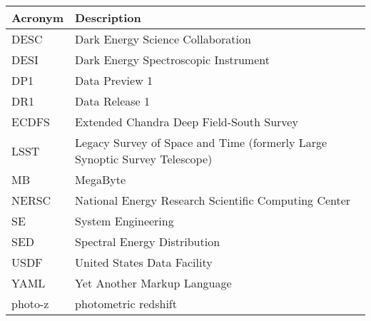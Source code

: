 \addtocounter{table}{-1}
\begin{longtable}{p{}p{}}\hline
\textbf{Acronym} & \textbf{Description}  \\\hline

DESC & Dark Energy Science Collaboration \\\hline
DESI & Dark Energy Spectroscopic Instrument \\\hline
DP1 & Data Preview 1 \\\hline
DR1 & Data Release 1 \\\hline
ECDFS & Extended Chandra Deep Field-South Survey \\\hline
LSST & Legacy Survey of Space and Time (formerly Large Synoptic Survey Telescope) \\\hline
MB & MegaByte \\\hline
NERSC & National Energy Research Scientific Computing Center \\\hline
SE & System Engineering \\\hline
SED & Spectral Energy Distribution \\\hline
USDF & United States Data Facility \\\hline
YAML & Yet Another Markup Language \\\hline
photo-z & photometric redshift \\\hline
\end{longtable}
